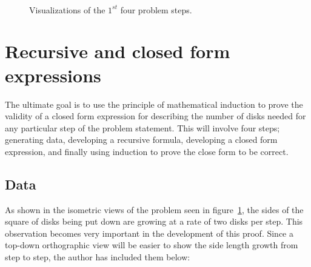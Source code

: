\documentclass[11pt]{article}
\begin{document}
		\begin{figure}[h]
			\\
			\begin{center}
			\end{center}
			\caption{Visualizations of the $1^{st}$ four problem steps.}
			\label{fig:disks_iso}
		\end{figure}
	\newpage
	\section{Recursive and closed form expressions}
		The ultimate goal is to use the principle of mathematical induction to prove the validity of a closed form expression 
		for describing the number of disks needed for any particular step of the problem statement.  This will involve four 
		steps; generating data, developing a recursive formula, developing a closed form expression, and finally using induction 
		to prove the close form to be correct.
	
	\subsection{Data}
		As shown in the isometric views of the problem seen in figure~\ref{fig:disks_iso}, the sides of the square of disks being put down are growing 
		at a rate of two disks per step.  This observation becomes very important in the development of this proof.  Since a top-down orthographic view will be easier to show
		the side length growth from step to step, the author has included them below:
		
\end{document}
